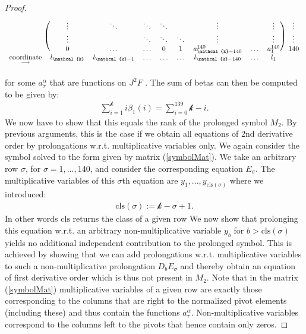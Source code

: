 \begin{proof}
\begin{align}
\begin{blockarray}{cccccccccc}
\begin{block}{c(cccccccc)c}
    & \vdots & \ddots  & \ddots & \ddots &  & \vdots & & \vdots & \vdots \\
    & \vdots & & \ddots & \ddots & \ddots & \vdots & & \vdots &  \vdots\\
    & 0 & \hdots  & \hdots & 0 & 1 & a^{140}_{\mathcal{k}-140} & \hdots & a^{140}_{1} &  140 \\
\end{block}
\underset{\longrightarrow}{\text{coordinate}} & l_{\mathcal{k}} & l_{\mathcal{k} -1} & \hdots & \hdots & \hdots & l_{\mathcal{k}- 140} & \hdots & l_1 &
\end{blockarray}
\end{align}
for some $a^{\alpha}_{\tau}$ that are functions on $J^2F$ . The sum of betas can then be computed to be given by:
\begin{align}
    \sum_{i=1}^{\mathcal{k}} i \beta_1(i) = \sum_{i = 0}^{139} \mathcal{k} - i .
\end{align}
We now have to show that this equals the rank of the prolonged symbol $M_2$. By previous arguments, this is the case if we obtain all equations of $2$nd derivative order by prolongations w.r.t. multiplicative variables only. We again consider the symbol solved to the form given by matrix (\ref{symbolMat}). 
We take an arbitrary row $\sigma$, for $\sigma=1,...,140$, and consider the corresponding equation $E_{\sigma}$. The multiplicative variables of this $\sigma$th equation are $y_1,...,y_{\mathrm{cls}(\sigma)}$ where we introduced: 
\begin{align}
\mathrm{cls}(\sigma):= \mathcal{k} - \sigma +1.
\end{align}
In other words $\mathrm{cls}$ returns the class of a given row
We now show that prolonging this equation w.r.t. an arbitrary non-multiplicative variable $y_b$ for $b>\mathrm{cls}(\sigma)$ yields no additional independent contribution to the prolonged symbol. This is achieved by showing that we can add prolongations w.r.t. multiplicative variables to such a non-multiplicative prolongation $D_bE_{\sigma}$ and thereby obtain an equation of first derivative order which is thus not present in $M_2$. Note that in the matrix (\ref{symbolMat}) multiplicative variables of a given row are exactly those corresponding to the columns that are right to the normalized pivot elements (including these) and thus contain the functions $a^{\alpha}_{\tau}$. Non-multiplicative variables correspond to the columns left to the pivots that hence contain only zeros.


\end{proof}
